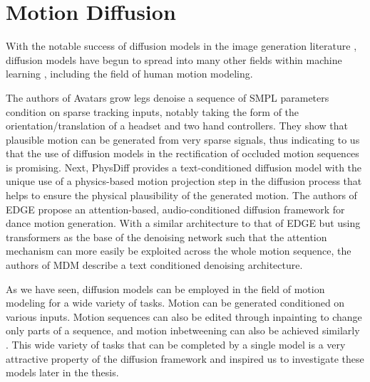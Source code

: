 \section{Motion Diffusion}
\label{sec:related_diffusion}

With the notable success of diffusion models in the image generation literature \cite{ddpm, diffusion_beats_gans, stable_diffusion}, diffusion models have begun to spread into many other fields within machine learning \cite{diffusion_review}, including the field of human motion modeling.


The authors of Avatars grow legs \cite{AvatarsGrowLegs} denoise a sequence of SMPL \cite{SMPL} parameters condition on sparse tracking inputs, notably taking the form of the orientation/translation of a headset and two hand controllers. They show that plausible motion can be generated from very sparse signals, thus indicating to us that the use of diffusion models in the rectification of occluded motion sequences is promising. Next, PhysDiff \cite{PhysDiff} provides a text-conditioned diffusion model with the unique use of a physics-based motion projection step in the diffusion process that helps to ensure the physical plausibility of the generated motion. The authors of EDGE \cite{EDGE} propose an attention-based, audio-conditioned diffusion framework for dance motion generation. With a similar architecture to that of EDGE \cite{EDGE} but using transformers as the base of the denoising network such that the attention mechanism can more easily be exploited across the whole motion sequence, the authors of MDM \cite{MDM} describe a text conditioned denoising architecture.

As we have seen, diffusion models can be employed in the field of motion modeling for a wide variety of tasks. Motion can be generated \cite{MDM, EDGE, AvatarsGrowLegs} conditioned on various inputs. Motion sequences can also be edited through inpainting \cite{diffusion_inpainting, MDM} to change only parts of a sequence, and motion inbetweening can also be achieved similarly \cite{MDM}. This wide variety of tasks that can be completed by a single model is a very attractive property of the diffusion framework and inspired us to investigate these models later in the thesis.